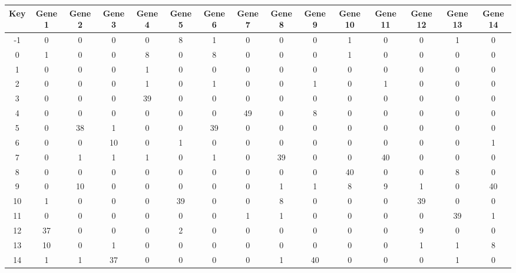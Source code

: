 \begin{tabular}{|c|c|c|c|c|c|c|c|c|c|c|c|c|c|c|}
\hline
Key & Gene 1 & Gene 2 & Gene 3 & Gene 4 & Gene 5 & Gene 6 & Gene 7 & Gene 8 & Gene 9 & Gene 10 & Gene 11 & Gene 12 & Gene 13 & Gene 14 \\
\hline
-1 & 0 & 0 & 0 & 0 & 8 & 1 & 0 & 0 & 0 & 1 & 0 & 0 & 1 & 0 \\
0 & 1 & 0 & 0 & 8 & 0 & 8 & 0 & 0 & 0 & 1 & 0 & 0 & 0 & 0 \\
1 & 0 & 0 & 0 & 1 & 0 & 0 & 0 & 0 & 0 & 0 & 0 & 0 & 0 & 0 \\
2 & 0 & 0 & 0 & 1 & 0 & 1 & 0 & 0 & 1 & 0 & 1 & 0 & 0 & 0 \\
3 & 0 & 0 & 0 & 39 & 0 & 0 & 0 & 0 & 0 & 0 & 0 & 0 & 0 & 0 \\
4 & 0 & 0 & 0 & 0 & 0 & 0 & 49 & 0 & 8 & 0 & 0 & 0 & 0 & 0 \\
5 & 0 & 38 & 1 & 0 & 0 & 39 & 0 & 0 & 0 & 0 & 0 & 0 & 0 & 0 \\
6 & 0 & 0 & 10 & 0 & 1 & 0 & 0 & 0 & 0 & 0 & 0 & 0 & 0 & 1 \\
7 & 0 & 1 & 1 & 1 & 0 & 1 & 0 & 39 & 0 & 0 & 40 & 0 & 0 & 0 \\
8 & 0 & 0 & 0 & 0 & 0 & 0 & 0 & 0 & 0 & 40 & 0 & 0 & 8 & 0 \\
9 & 0 & 10 & 0 & 0 & 0 & 0 & 0 & 1 & 1 & 8 & 9 & 1 & 0 & 40 \\
10 & 1 & 0 & 0 & 0 & 39 & 0 & 0 & 8 & 0 & 0 & 0 & 39 & 0 & 0 \\
11 & 0 & 0 & 0 & 0 & 0 & 0 & 1 & 1 & 0 & 0 & 0 & 0 & 39 & 1 \\
12 & 37 & 0 & 0 & 0 & 2 & 0 & 0 & 0 & 0 & 0 & 0 & 9 & 0 & 0 \\
13 & 10 & 0 & 1 & 0 & 0 & 0 & 0 & 0 & 0 & 0 & 0 & 1 & 1 & 8 \\
14 & 1 & 1 & 37 & 0 & 0 & 0 & 0 & 1 & 40 & 0 & 0 & 0 & 1 & 0 \\
\hline
\end{tabular}
